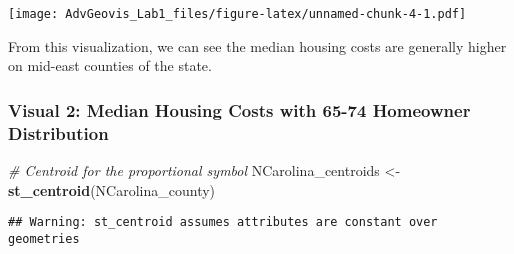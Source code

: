 \documentclass[
]{article}
\newenvironment{Shaded}{\begin{snugshade}}{\end{snugshade}}
\newcommand{\CommentTok}[1]{\textcolor[rgb]{0.56,0.35,0.01}{\textit{#1}}}
\newcommand{\FunctionTok}[1]{\textcolor[rgb]{0.13,0.29,0.53}{\textbf{#1}}}
\newcommand{\NormalTok}[1]{#1}
\newcommand{\OtherTok}[1]{\textcolor[rgb]{0.56,0.35,0.01}{#1}}
\begin{document}
\texttt{[image: AdvGeovis\_Lab1\_files/figure-latex/unnamed-chunk-4-1.pdf]}

From this visualization, we can see the median housing costs are
generally higher on mid-east counties of the state.

\subsubsection{Visual 2: Median Housing Costs with 65-74 Homeowner
Distribution}\label{visual-2-median-housing-costs-with-65-74-homeowner-distribution}

\begin{Shaded}
\begin{Highlighting}[]
\CommentTok{\# Centroid for the proportional symbol}
\NormalTok{NCarolina\_centroids }\OtherTok{\textless{}{-}} \FunctionTok{st\_centroid}\NormalTok{(NCarolina\_county)}
\end{Highlighting}
\end{Shaded}

\begin{verbatim}
## Warning: st_centroid assumes attributes are constant over geometries
\end{verbatim}
\end{document}
